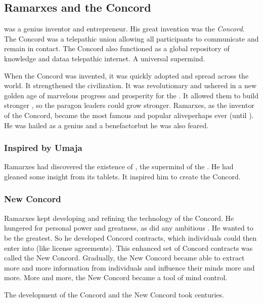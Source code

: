 \subsection{Ramarxes and the Concord}
 was a genius \caisith inventor and entrepreneur. 
His great invention was the \emph{Concord}. 
The Concord was a telepathic union allowing all participants to communicate and remain in contact.
The Concord also functioned as a global repository of knowledge and data\dash a telepathic internet. 
A universal \caisith supermind. 

When the Concord was invented, it was quickly adopted and spread across the world. 
It strengthened the \caisith civilization.
It was revolutionary and ushered in a new golden age of marvelous progress and prosperity for the \caisith. 
It allowed them to build stronger \nexuses, so the paragon leaders could grow stronger. 
Ramarxes, as the inventor of the Concord, became the most famous and popular \caisith alive\dash perhaps ever (until \Sethicus). 
He was hailed as a genius and a benefactor\dash but he was also feared. 





\subsubsection{Inspired by Umaja}
Ramarxes had discovered the existence of , the supermind of the . 
He had gleaned some insight from its tablets. 
It inspired him to create the Concord. 





\subsubsection{New Concord}
Ramarxes kept developing and refining the technology of the Concord. 
He hungered for personal power and greatness, as did any ambitious \caisith. 
He wanted to be the greatest. 
So he developed  Concord contracts, which individuals could then enter into (like license agreements). 
This enhanced set of Concord contracts was called the New Concord. 
Gradually, the New Concord became able to extract more and more information from individuals and influence their minds more and more.
More and more, the New Concord became a tool of mind control. 

The development of the Concord and the New Concord took centuries. 





